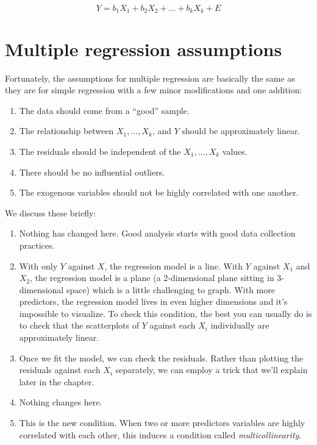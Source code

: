 \documentclass[
]{book}
\providecommand{\tightlist}{%
  \setlength{\itemsep}{0pt}\setlength{\parskip}{0pt}}
\begin{document}
\[
Y = b_{1}X_{1} + b_{2}X_{2}  + \dots + b_{k}X_{k} + E
\]

\hypertarget{multiple-assumptions}{%
\section{Multiple regression assumptions}\label{multiple-assumptions}}

Fortunately, the assumptions for multiple regression are basically the same as they are for simple regression with a few minor modifications and one addition:

\begin{enumerate}
\def\labelenumi{\arabic{enumi}.}
\tightlist
\item
  The data should come from a ``good'' sample.
\item
  The relationship between \(X_{1}, \dots, X_{k}\), and \(Y\) should be approximately linear.
\item
  The residuals should be independent of the \(X_{1}, \dots, X_{k}\) values.
\item
  There should be no influential outliers.
\item
  The exogenous variables should not be highly correlated with one another.
\end{enumerate}

We discuss these briefly:

\begin{enumerate}
\def\labelenumi{\arabic{enumi}.}
\tightlist
\item
  Nothing has changed here. Good analysis starts with good data collection practices.
\item
  With only \(Y\) against \(X\), the regression model is a line. With \(Y\) against \(X_{1}\) and \(X_{2}\), the regression model is a plane (a 2-dimensional plane sitting in 3-dimensional space) which is a little challenging to graph. With more predictors, the regression model lives in even higher dimensions and it's impossible to visualize. To check this condition, the best you can usually do is to check that the scatterplots of \(Y\) against each \(X_{i}\) individually are approximately linear.
\item
  Once we fit the model, we can check the residuals. Rather than plotting the residuals against each \(X_{i}\) separately, we can employ a trick that we'll explain later in the chapter.
\item
  Nothing changes here.
\item
  This is the new condition. When two or more predictors variables are highly correlated with each other, this induces a condition called \emph{multicollinearity}.
\end{enumerate}
\end{document}
